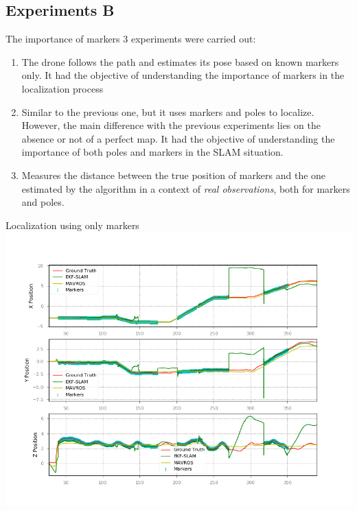 \documentclass[serif]{beamer}
\begin{document}
    \subsection{Experiments B}
    \begin{frame}{The importance of markers}
        3 experiments were carried out:
        \begin{enumerate}
            \item{The drone follows the path and estimates its pose based on known markers only. It had the objective of understanding the importance of markers in the localization process}
            \item{Similar to the previous one, but it uses markers and poles to localize. However, the main difference with the previous experiments lies on the absence or not of a perfect map. It had the objective of understanding the importance of both poles and markers in the SLAM situation.}
            \item{Measures the distance between the true position of markers and the one estimated by the algorithm in a context of \emph{real observations}, both for markers and poles.}
        \end{enumerate}
    \end{frame}

    \begin{frame}[nonumber]{Localization using only markers}
        \centering
        \includegraphics[width=0.7\linewidth]{Images/fig21-real-marker-wmap.png}
    \end{frame}
\end{document}
